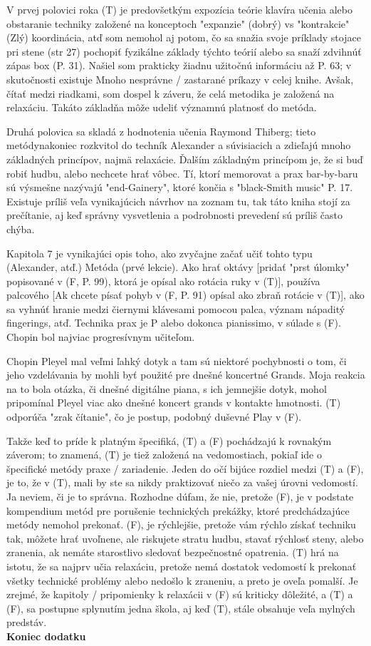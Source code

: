 \documentclass[11pt,a4paper%
]{article}
\begin{document}
V prvej polovici roka (T) je predovšetkým expozícia teórie klavíra učenia alebo obstaranie techniky založené na konceptoch "expanzie" (dobrý) vs "kontrakcie" (Zlý) koordinácia, atď som nemohol aj potom, čo sa snažia svoje príklady stojace pri stene (str 27) pochopiť fyzikálne základy týchto teórií alebo sa snaží zdvihnúť zápas box (P. 31). Našiel som prakticky žiadnu užitočnú informáciu až P. 63; v skutočnosti existuje Mnoho nesprávne / zastarané príkazy v celej knihe. Avšak, čítať medzi riadkami, som dospel k záveru, že celá metodika je založená na relaxáciu. Takáto základňa môže udeliť významnú platnosť do metóda.

Druhá polovica sa skladá z hodnotenia učenia Raymond Thiberg; tieto metódynakoniec rozkvitol do techník Alexander a súvisiacich a zdieľajú mnoho základných princípov, najmä relaxácie. Ďalším základným princípom je, že si buď robiť hudbu, alebo nechcete hrať vôbec. Tí, ktorí memorovat a prax bar-by-baru sú výsmešne nazývajú "end-Gainery", ktoré končia s "black-Smith music" P. 17. Existuje príliš veľa vynikajúcich návrhov na zoznam tu, tak táto kniha stojí za prečítanie, aj keď správny vysvetlenia a podrobnosti prevedení sú príliš často chýba.

Kapitola 7 je vynikajúci opis toho, ako zvyčajne začať učiť tohto typu (Alexander, atď.) Metóda (prvé lekcie). Ako hrať oktávy [pridať "prst úlomky" popisované v (F, P. 99), ktorá je opísal ako rotácia ruky v (T)], používa palcového [Ak chcete písať pohyb v (F, P. 91) opísal ako zbraň rotácie v (T)], ako sa vyhnúť hranie medzi čiernymi klávesami pomocou palca, význam nápaditý fingerings, atď. Technika prax je P alebo dokonca pianissimo, v súlade s (F). Chopin bol najviac progresívnym učiteľom.

Chopin Pleyel mal veľmi ľahký dotyk a tam sú niektoré pochybnosti o tom, či jeho vzdelávania by mohli byť použité pre dnešné koncertné Grands. Moja reakcia na to bola otázka, či dnešné digitálne piana, s ich jemnejšie dotyk, mohol pripomínal Pleyel viac ako dnešné koncert grands v kontakte hmotnosti. (T) odporúča "zrak čítanie", čo je postup, podobný duševné Play v (F).

Takže keď to príde k platným špecifiká, (T) a (F) pochádzajú k rovnakým záverom; to znamená, (T) je tiež založená na vedomostiach, pokiaľ ide o špecifické metódy praxe / zariadenie. Jeden do očí bijúce rozdiel medzi (T) a (F), je to, že v (T), mali by ste sa nikdy praktizovať niečo za vašej úrovni vedomostí. Ja neviem, či je to správna. Rozhodne dúfam, že nie, pretože (F), je v podstate kompendium metód pre porušenie technických prekážky, ktoré predchádzajúce metódy nemohol prekonať. (F), je rýchlejšie, pretože vám rýchlo získať techniku ​​tak, môžete hrať uvoľnene, ale riskujete stratu hudbu, stavať rýchlosť steny, alebo zranenia, ak nemáte starostlivo sledovať bezpečnostné opatrenia. (T) hrá na istotu, že sa najprv učia relaxáciu, pretože nemá dostatok vedomostí k prekonať všetky technické problémy alebo nedošlo k zraneniu, a preto je oveľa pomalší. Je zrejmé, že kapitoly / pripomienky k relaxácii v (F) sú kriticky dôležité, a (T) a (F), sa postupne splynutím jedna škola, aj keď (T), stále obsahuje veľa mylných predstáv.
\bigskip\\
\textbf{Koniec dodatku}
\end{document}
